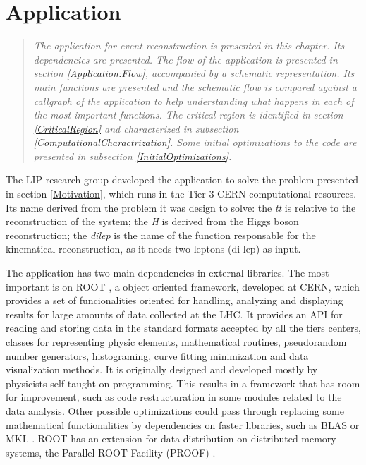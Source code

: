 \chapter{\tth Application}
\label{Application}

\begin{quote}
\textit{The \tth application for event reconstruction is presented in this chapter. Its dependencies are presented. The flow of the application is presented in section \ref{Application:Flow}, accompanied by a schematic representation. Its main functions are presented and the schematic flow is compared against a callgraph of the application to help understanding what happens in each of the most important functions. The critical region is identified in section \ref{CriticalRegion} and characterized in subsection \ref{ComputationalCharactrization}. Some initial optimizations to the code are presented in subsection \ref{InitialOptimizations}.}
\end{quote}

The LIP research group developed the \tth application to solve the problem presented in section \ref{Motivation}, which runs in the Tier-3 CERN computational resources. Its name derived from the problem it was design to solve: the \textit{tt} is relative to the reconstruction of the \ttbar system; the \textit{H} is derived from the Higgs boson reconstruction; the \textit{dilep} is the name of the function responsable for the kinematical reconstruction, as it needs two leptons (di-lep) as input.

The application has two main dependencies in external libraries. The most important is on ROOT \cite{CERN:ROOT}, a object oriented framework, developed at CERN, which provides a set of funcionalities oriented for handling, analyzing and displaying results for large amounts of data collected at the LHC. It provides an API for reading and storing data in the standard formats accepted by all the tiers centers, classes for representing physic elements, mathematical routines, pseudorandom number generators, histograming, curve fitting minimization and data visualization methods. It is originally designed and developed mostly by physicists self taught on programming. This results in a framework that has room for improvement, such as code restructuration in some modules related to the data analysis. Other possible optimizations could pass through replacing some mathematical functionalities by dependencies on faster libraries, such as BLAS \cite{BLAS} or MKL \cite{MKL}. ROOT has an extension for data distribution on distributed memory systems, the Parallel ROOT Facility (PROOF) \cite{CERN:PROOF}.

